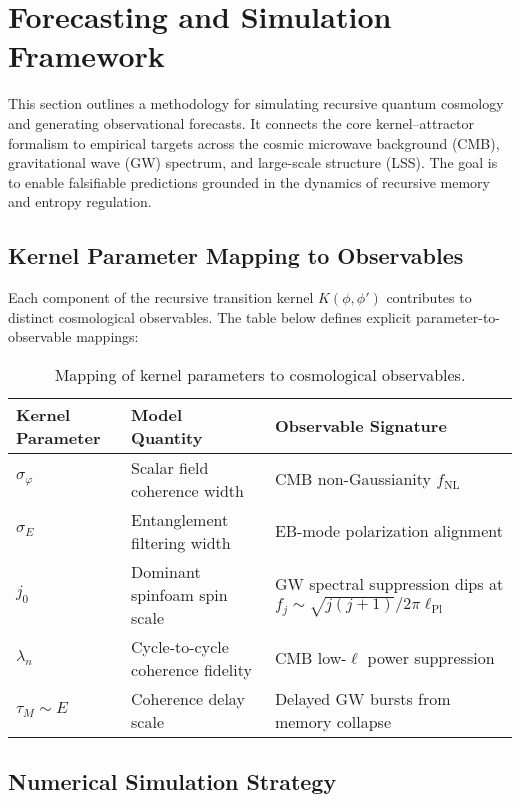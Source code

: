 \section{Forecasting and Simulation Framework}
\label{sec:forecasting}

This section outlines a methodology for simulating recursive quantum cosmology and generating observational forecasts. It connects the core kernel–attractor formalism to empirical targets across the cosmic microwave background (CMB), gravitational wave (GW) spectrum, and large-scale structure (LSS). The goal is to enable falsifiable predictions grounded in the dynamics of recursive memory and entropy regulation.

\subsection{Kernel Parameter Mapping to Observables}

Each component of the recursive transition kernel \( K(\phi, \phi') \) contributes to distinct cosmological observables. The table below defines explicit parameter-to-observable mappings:

\begin{table}[H]
\centering
\begin{tabular}{lll}
\toprule
\textbf{Kernel Parameter} & \textbf{Model Quantity} & \textbf{Observable Signature} \\
\midrule
\( \sigma_\varphi \) & Scalar field coherence width & CMB non-Gaussianity \( f_{\text{NL}} \) \\
\( \sigma_E \) & Entanglement filtering width & EB-mode polarization alignment \\
\( j_0 \) & Dominant spinfoam spin scale & GW spectral suppression dips at \( f_j \sim \sqrt{j(j+1)} / 2\pi \ell_{\text{Pl}} \) \\
\( \lambda_n \) & Cycle-to-cycle coherence fidelity & CMB low-\( \ell \) power suppression \\
\( \tau_M \sim E \) & Coherence delay scale & Delayed GW bursts from memory collapse \\
\bottomrule
\end{tabular}
\caption{Mapping of kernel parameters to cosmological observables.}
\end{table}

\subsection{Numerical Simulation Strategy}

